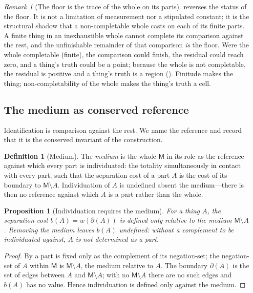 \documentclass[11pt,a4paper]{article}
\theoremstyle{thmstyle}
\newtheorem{proposition}[theorem]{Proposition}
\theoremstyle{definition}
\newtheorem{definition}[theorem]{Definition}
\theoremstyle{remark}
\newtheorem{remark}[theorem]{Remark}
\newcommand{\wt}{w}                       %
\newcommand{\cut}{\partial}               %
\newcommand{\med}{\mathsf{M}}             %
\begin{document}
\begin{remark}[The floor is the trace of the whole on its parts]
\label{rem:floor-trace}
 reverses the status of the floor. It is not a
limitation of measurement nor a stipulated constant; it is the structural
shadow that a non-completable whole casts on each of its finite parts. A finite
thing in an inexhaustible whole cannot complete its comparison against the rest,
and the unfinishable remainder of that comparison \emph{is} the floor. Were the
whole completable \textup{(}finite\textup{)}, the comparison could finish, the
residual could reach zero, and a thing's truth could be a point; because the
whole is not completable, the residual is positive and a thing's truth is a
region \textup{(}\textup{)}. Finitude makes the thing;
non-completability of the whole makes the thing's truth a cell.
\end{remark}

\subsection{The medium as conserved reference}

Identification is comparison against the rest. We name the reference and record
that it is the conserved invariant of the construction.

\begin{definition}[Medium]
\label{def:medium}
The \emph{medium} is the whole $\med$ in its role as the reference against which
every part is individuated: the totality simultaneously in contact with every
part, such that the separation cost of a part $A$ is the cost of its boundary to
$\med\setminus A$. Individuation of $A$ is undefined absent the medium---there is
then no reference against which $A$ is a part rather than the whole.
\end{definition}

\begin{proposition}[Individuation requires the medium]
\label{prop:medium-required}
For a thing $A$, the separation cost $b(A)=\wt(\cut(A))$ is defined only relative
to the medium $\med\setminus A$. Removing the medium leaves $b(A)$ undefined:
without a complement to be individuated against, $A$ is not determined as a part.
\end{proposition}

\begin{proof}
By  a part is fixed only as the complement of its
negation-set; the negation-set of $A$ within $\med$ is $\med\setminus A$, the
medium relative to $A$. The boundary $\cut(A)$ is the set of edges between $A$ and
$\med\setminus A$; with no $\med\setminus A$ there are no such edges and $b(A)$
has no value. Hence individuation is defined only against the medium.
\end{proof}
\end{document}
